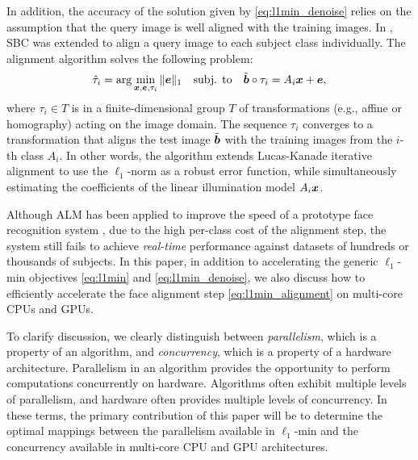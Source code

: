\documentclass[preprint]{sigplanconf}
\begin{document}
In addition, the accuracy of the solution given by \eqref{eq:l1min_denoise} relies on the assumption
that the query image is well aligned with the training images.
In \cite{WagnerA2009-CVPR}, SBC was extended to align
a query image to each subject class individually. The alignment algorithm solves
the following problem:
\begin{equation}
\hat{\tau}_i = \arg\min_{{\boldsymbol{x}}, {\boldsymbol{e}}, \tau_i} \|{\boldsymbol{e}}\|_1\quad \mbox{subj. to}\quad \tilde{{\boldsymbol{b}}}\circ\tau_i = A_i{\boldsymbol{x}} + {\boldsymbol{e}},
\label{eq:l1min_alignment}
\end{equation}
where $\tau_i\in T$ is in a finite-dimensional group $T$ of transformations
(e.g., affine or homography) acting on the image domain.  The sequence
$\tau_i$ converges to a transformation that aligns the test image $\tilde{{\boldsymbol{b}}}$
with the training images from the $i$-th class $A_i$. In other words, the algorithm 
extends Lucas-Kanade iterative alignment \cite{LucasB1981} to use the
$\ell_1$-norm as a robust error function, while simultaneously estimating
the coefficients of the linear illumination model $A_i{\boldsymbol{x}}$.  

Although ALM has been applied to improve the speed of a prototype face recognition system \cite{WagnerA2011-PAMI},
due to the high per-class cost
of the alignment step, the system still fails to achieve \emph{real-time}
performance against datasets of hundreds or thousands of subjects.  In this paper,
in addition to accelerating the generic
$\ell_1$-min objectives \eqref{eq:l1min} and \eqref{eq:l1min_denoise}, we 
also discuss how to efficiently accelerate the face alignment step
\eqref{eq:l1min_alignment} on multi-core CPUs and GPUs.

To clarify discussion, we clearly distinguish between {\em parallelism},
which is a property of an algorithm, and {\em concurrency}, which is a
property of a hardware architecture. Parallelism in an algorithm provides the
opportunity to perform computations concurrently on hardware.  Algorithms often
exhibit multiple levels of parallelism, and hardware often provides multiple
levels of concurrency.  In these terms, the primary contribution of this paper
will be to determine the optimal mappings between the parallelism available in
$\ell_1$-min and the concurrency available in multi-core CPU and GPU
architectures.
\end{document}
